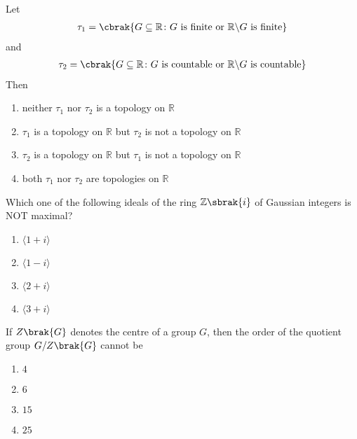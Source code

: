 \iffalse
\chapter{2009}
\author{EE24BTECH11002}
\section{ma}
\fi
    \item Let
	\begin{align*}
		\tau_1 = \cbrak{G \subseteq \mathbb{R} \colon G \text{ is finite or } \mathbb{R} \backslash G \text{ is finite}}	
	\end{align*} 
	and
	\begin{align*}
		\tau_2 = \cbrak{G \subseteq \mathbb{R} \colon G \text{ is countable or } \mathbb{R} \backslash G \text{ is countable}}	
	\end{align*}
	Then
	\hfill{}

	\begin{enumerate}
		\item neither $\tau_1$ nor $\tau_2$ is a topology on $\mathbb{R}$
		\item $\tau_1$ is a topology on $\mathbb{R}$ but $\tau_2$ is not a topology on $\mathbb{R}$
		\item $\tau_2$ is a topology on $\mathbb{R}$ but $\tau_1$ is not a topology on $\mathbb{R}$
		\item both $\tau_1$ nor $\tau_2$ are topologies on $\mathbb{R}$
	\end{enumerate}

    \item Which one of the following ideals of the ring $\mathbb{Z}\sbrak{i}$ of Gaussian integers is NOT maximal?
	\hfill{}

	\begin{enumerate}
		\item $\langle 1 + i \rangle$
		\item $\langle 1 - i \rangle$
		\item $\langle 2 + i \rangle$
		\item $\langle 3 + i \rangle$
	\end{enumerate}

    \item If $Z\brak{G}$ denotes the centre of a group $G$, then the order of the quotient group $G/Z\brak{G}$ cannot be
	\hfill{}

	\begin{enumerate}
		\item $4$ 
		\item $6$
		\item $15$
		\item $25$
	\end{enumerate}


